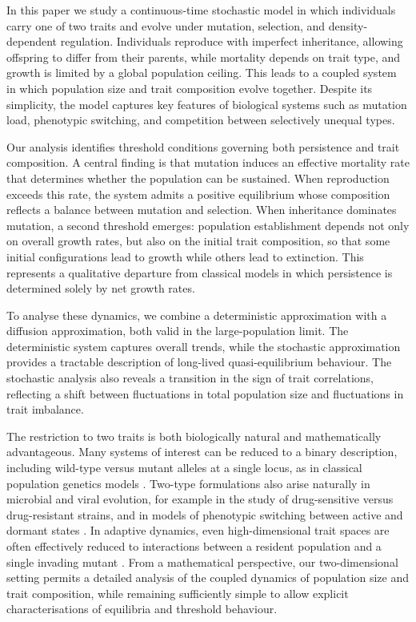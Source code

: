 \documentclass[12pt]{article}
\begin{document}
In this paper we study a continuous-time stochastic model in which
individuals carry one of two traits and evolve under mutation,
selection, and density-dependent regulation. Individuals reproduce with
imperfect inheritance, allowing offspring to differ from their parents,
while mortality depends on trait type, and growth is limited by a global
population ceiling. This leads to a coupled system in which population
size and trait composition evolve together. Despite its simplicity, the
model captures key features of biological systems such as mutation load,
phenotypic switching, and competition between selectively unequal types.

Our analysis identifies threshold conditions governing both persistence
and trait composition. A central finding is that mutation induces an
effective mortality rate that determines whether the population can be
sustained. When reproduction exceeds this rate, the system admits a
positive equilibrium whose composition reflects a balance between
mutation and selection. When inheritance dominates mutation, a second
threshold emerges: population establishment depends not only on overall
growth rates, but also on the initial trait composition, so that some
initial configurations lead to growth while others lead to extinction.
This represents a qualitative departure from classical models in which
persistence is determined solely by net growth rates.

To analyse these dynamics, we combine a deterministic approximation with
a diffusion approximation, both valid in the large-population limit. The
deterministic system captures overall trends, while the stochastic
approximation provides a tractable description of long-lived 
quasi-equilibrium behaviour. The stochastic analysis also reveals a transition
in the sign of trait correlations, reflecting a shift between
fluctuations in total population size and fluctuations in trait
imbalance.

The restriction to two traits is both biologically natural and
mathematically advantageous. Many systems of interest can be reduced to
a binary description, including wild-type versus mutant alleles at a
single locus, as in classical population genetics models
\cite{ewens2004,nowak2006}. Two-type formulations also arise naturally
in microbial and viral evolution, for example in the study of
drug-sensitive versus drug-resistant strains, and in models of
phenotypic switching between active and dormant states
\cite{kussell2005a,kussell2005b}. In adaptive dynamics, even
high-dimensional trait spaces are often effectively reduced to
interactions between a resident population and a single invading mutant
\cite{champagnat2006}. From a mathematical perspective, our
two-dimensional setting permits a detailed analysis of the coupled
dynamics of population size and trait composition, while remaining
sufficiently simple to allow explicit characterisations of equilibria
and threshold behaviour.
\end{document}
